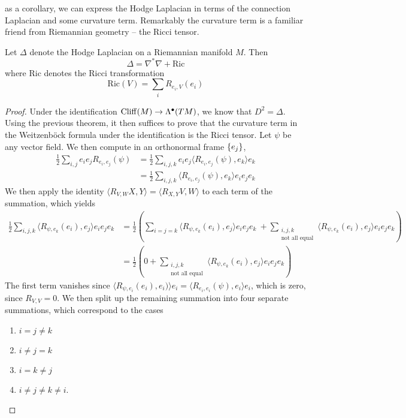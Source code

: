 as a corollary, we can express the Hodge Laplacian in terms of the connection Laplacian
and some curvature term. Remarkably the curvature term is a familiar friend from
Riemannian geometry -- the Ricci tensor.
%
\begin{cor}
Let $\Delta$ denote the Hodge Laplacian on a Riemannian manifold $M$. Then
\[
\Delta = \nabla^*\nabla + \mathrm{Ric}
\]
where $\mathrm{Ric}$ denotes the Ricci transformation
\[
\mathrm{Ric}(V) = \sum_{i} R_{e_i,V}(e_i)
\]
\end{cor}
%
\begin{proof}
Under the identification $\operatorname{Cliff}(M) \to \Lambda^\bullet(TM)$, we know that
$D^2 = \Delta$. Using the previous theorem, it then suffices to prove that the curvature
term in the Weitzenb\"ock formula under the identification is the Ricci tensor.
Let $\psi$ be any vector field. We then compute in an orthonormal frame $\left\lbrace e_j \right\rbrace$,
\begin{align*}
\frac{1}{2}\sum_{i,j}e_ie_jR_{e_i,e_j}(\psi)
&= \frac{1}{2}\sum_{i,j,k}e_ie_j\langle R_{e_i,e_j}(\psi), e_k\rangle e_k \\
&= \frac{1}{2}\sum_{i,j,k}\langle R_{e_i,e_j}(\psi), e_k\rangle e_ie_je_k
\end{align*}
We then apply the identity $\langle R_{V,W}X,Y\rangle = \langle R_{X,Y}V, W \rangle$
to each term of the summation, which yields
\begin{align*}
\frac{1}{2}\sum_{i,j,k} \langle R_{\psi,e_k}(e_i), e_j\rangle e_ie_je_k
&= \frac{1}{2}\left( \sum_{i = j = k} \langle R_{\psi,e_k}(e_i), e_j\rangle e_ie_je_k
~+ \sum_{\substack{i,j,k \\ \text{not all equal}}}
\langle R_{\psi,e_k}(e_i), e_j\rangle e_ie_je_k \right) \\[5pt]
&= \frac{1}{2}\left( 0 + \sum_{\substack{i,j,k \\ \text{not all equal}}}
\langle R_{\psi,e_k}(e_i), e_j\rangle e_ie_je_k \right)
\end{align*}
The first term vanishes since
$\langle R_{\psi,e_i}(e_i), e_i) \rangle e_i =\langle R_{e_i,e_i}(\psi),e_i\rangle e_i$,
which is zero, since $R_{V,V} = 0$. We then split up the remaining summation into four
separate summations, which correspond to the cases
\begin{enumerate}
  \item $i = j \neq k$
  \item $i \neq j = k$
  \item $i = k \neq j$
  \item $i \neq j \neq k \neq i$.

\end{enumerate}
\end{proof}
